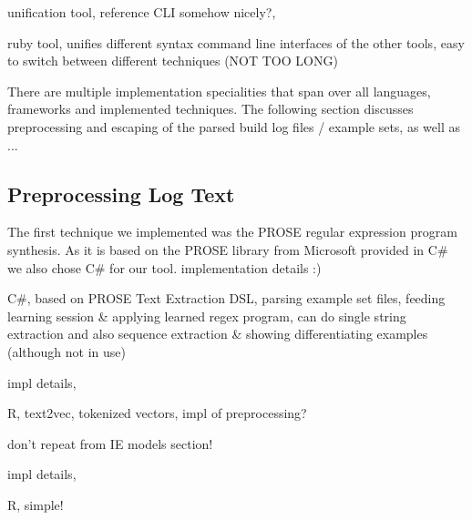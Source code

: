 \documentclass[\myrootdir/main.tex]{subfiles}
\begin{document}
unification tool, reference CLI somehow nicely?,

ruby tool, unifies different syntax command line interfaces of the other tools, easy to switch between different techniques (NOT TOO LONG)

There are multiple implementation specialities that span over all languages, frameworks and implemented techniques.
The following section discusses preprocessing and escaping of the parsed build log files / example sets, as well as ... 

\subsection*{Preprocessing Log Text}
\label{sec:impl-preprocessing}

\label{sec:impl-pbe}
The first technique we implemented was the PROSE regular expression program synthesis. As it is based on the PROSE library from Microsoft provided in C\# we also chose C\# for our tool. 
implementation details :)

C\#, based on PROSE Text Extraction DSL, parsing example set files, feeding learning session \& applying learned regex program, can do single string extraction and also sequence extraction \& showing differentiating examples (although not in use)

\label{sec:impl-ts}
impl details,

R, text2vec, tokenized vectors, impl of preprocessing?

don't repeat from IE models section!

\label{sec:impl-skws}
impl details,

R, simple!
\end{document}
